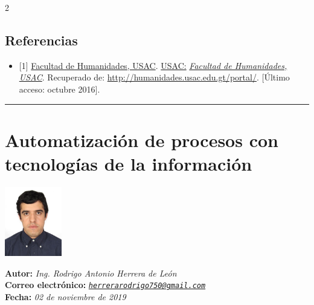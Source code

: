 \documentclass[12pt,spanish,Letterpaper,openany]{book}
\providecommand{\tightlist}{%
  \setlength{\itemsep}{0pt}\setlength{\parskip}{0pt}}
\newcommand{\tcolorboxcommand}{\begin{tcolorbox}[sharp corners=uphill, colback=newfondo, colframe=newfondo, arc=6mm, boxrule=0mm, boxsep=0mm]}
\newcommand{\HRule}{\begin{center}\rule{0.5\linewidth}{0.2mm}\end{center}}
\begin{document}
\begin {multicols}{2}
\hypertarget{referencias-1}{%
\section{Referencias}\label{referencias-1}}

\begin{itemize}
\tightlist
\item
  {[}1{]} \href{http://humanidades.usac.edu.gt/portal/}{Facultad de Humanidades, USAC}. \href{http://humanidades.usac.edu.gt}{USAC:} \href{http://humanidades.usac.edu.gt/portal/}{\emph{Facultad de Humanidades, USAC}}. Recuperado de: \url{http://humanidades.usac.edu.gt/portal/}. {[}Último acceso: octubre 2016{]}.
\end{itemize}

\end {multicols}

\medskip

\HRule

\medskip

\hypertarget{rherrera}{%
\chapter{Automatización de procesos con tecnologías de la información}\label{rherrera}}

\begin {flushleft}

\tcolorboxcommand

\begin{minipage}[c]{3cm}

\includegraphics[width=2.5cm,height=\textheight]{images/image01_rherrera.jpg}

\end{minipage}\begin{minipage}[c]{12cm}

\textbf{Autor:} \emph{Ing. Rodrigo Antonio Herrera de León}\\
\textbf{Correo electrónico:} \emph{\href{mailto:herrerarodrigo750@gmail.com}{\nolinkurl{herrerarodrigo750@gmail.com}}}\\
\textbf{Fecha:} \emph{02 de noviembre de 2019}

\end{minipage}

\end {tcolorbox}

\end {flushleft}
\end{document}

